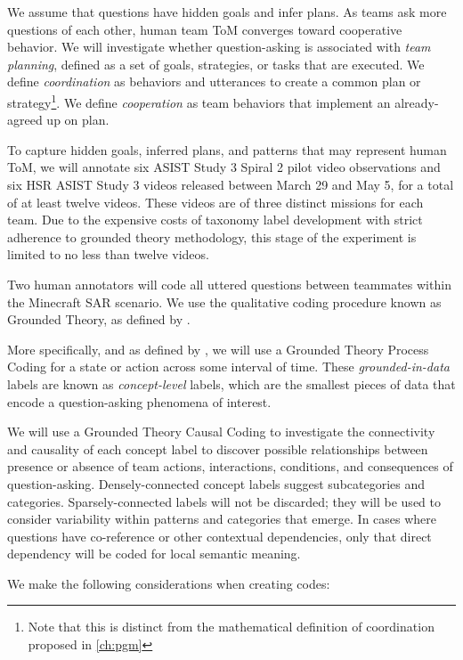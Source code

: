 We assume that questions have hidden goals and infer plans. As teams ask more
questions of each other, human team ToM converges toward cooperative behavior.
We will investigate whether question-asking is associated with \emph{team
planning}, defined as a set of goals, strategies, or tasks that are executed.
We define \emph{coordination} as behaviors and utterances to create a common
plan or strategy\footnote{Note that this is distinct from the mathematical
definition of coordination proposed in \autoref{ch:pgm}}. We define
\emph{cooperation} as team behaviors that implement an already-agreed up on
plan.

To capture hidden goals, inferred plans, and patterns that may represent human
ToM, we will annotate six ASIST Study 3 Spiral 2 pilot video observations and
six HSR ASIST Study 3 videos released between March 29 and May 5, for a total
of at least twelve videos. These videos are of three distinct missions for each
team. Due to the expensive costs of taxonomy label development with strict
adherence to grounded theory methodology, this stage of the experiment is
limited to no less than twelve videos. 

Two human annotators will code all uttered questions between teammates within the Minecraft SAR scenario.
We use the qualitative coding procedure known as Grounded Theory,
as defined by \citet{corbin_strauss_2015}. 

More specifically, and as defined by \citet{saldana_2021}, we will use a
Grounded Theory Process Coding for a state or action across some interval of
time. These \emph{grounded-in-data} labels are known as \emph{concept-level}
labels, which are the smallest pieces of data that encode a question-asking
phenomena of interest.

We will use a Grounded Theory Causal Coding to investigate the connectivity and
causality of each concept label to discover possible relationships between
presence or absence of team actions, interactions, conditions, and consequences
of question-asking. Densely-connected concept labels suggest subcategories and
categories. Sparsely-connected labels will not be discarded; they will be used
to consider variability within patterns and categories that emerge. In cases
where questions have co-reference or other contextual dependencies, only that
direct dependency will be coded for local semantic meaning.

We make the following considerations when creating codes: 

